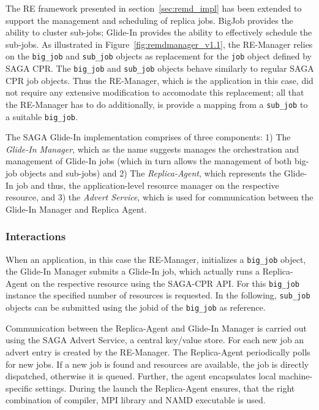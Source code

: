 \documentclass{rspublic}
\newcommand{\replicaagent}[1]{Replica-Agent }
\begin{document}
The RE framework presented in section~\ref{sec:remd_impl} has been
extended to support the management and scheduling of replica jobs.
BigJob provides the ability to cluster sub-jobs; Glide-In provides the
ability to effectively schedule the sub-jobs.  As illustrated in
Figure~\ref{fig:remdmanager_v1.1}, the RE-Manager relies on the
\texttt{big\_job} and \texttt{sub\_job} objects as replacement for the
\texttt{job} object defined by SAGA CPR.  The \texttt{big\_job} and
\texttt{sub\_job} objects behave similarly to regular SAGA CPR job
objects. Thus the RE-Manager, which is the application in this case,
did not require any extensive modification to accomodate this
replacement; all that the RE-Manager has to do additionally, is
provide a mapping from a \texttt{sub\_job} to a suitable
\texttt{big\_job}.

The SAGA Glide-In implementation comprises of three components: 1) The
\emph{Glide-In Manager}, which as the name suggests manages the
orchestration and management of Glide-In jobs (which in turn allows
the management of both big-job objects and sub-jobs) and 2) The
\emph{Replica-Agent}, which represents the Glide-In job and thus, the
application-level resource manager on the respective resource, and 3)
the \emph{Advert Service}, which is used for communication between the
Glide-In Manager and Replica Agent.

  
\subsubsection{Interactions}            
When an application, in this case the RE-Manager, initializes a
\texttt{big\_job} object, the Glide-In Manager submits a Glide-In job,
which actually runs a Replica-Agent on the respective resource using
the SAGA-CPR API.  For this \texttt{big\_job} instance the specified
number of resources is requested. In the following, \texttt{sub\_job}
objects can be submitted using the jobid of the \texttt{big\_job} as
reference.

Communication between the Replica-Agent and Glide-In Manager is
carried out using the SAGA Advert Service, a central key/value
store. For each new job an advert entry is created by the
RE-Manager. The \replicaagent\ periodically polls for new jobs.  If a
new job is found and resources are available, the job is directly
dispatched, otherwise it is queued. Further, the agent encapsulates
local machine-specific settings. During the launch the \replicaagent\
ensures, that the right combination of compiler, MPI library and NAMD
executable is used.
\end{document}
